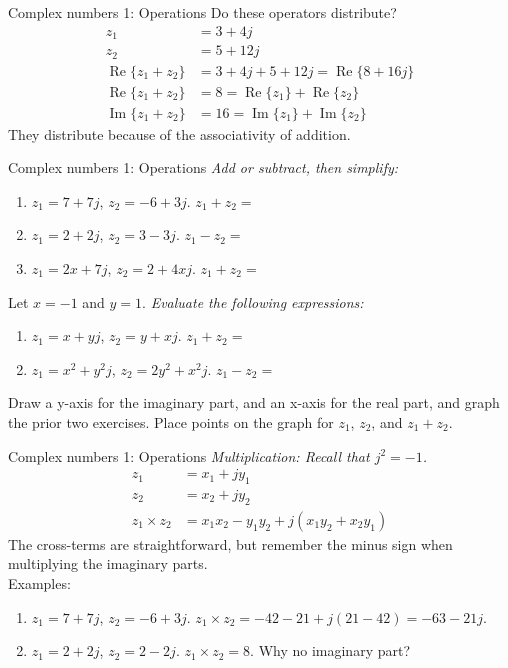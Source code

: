 \documentclass{beamer}
\begin{document}
\begin{frame}{Complex numbers 1: Operations}
Do these operators distribute?
\begin{align}
z_1 &= 3+4j \\
z_2 &= 5+12j \\
\operatorname{Re}\lbrace z_1+z_2 \rbrace &= 3+4j+5+12j = \operatorname{Re}\lbrace 8+16j \rbrace \\
\operatorname{Re}\lbrace z_1+z_2 \rbrace &= 8 = \operatorname{Re}\lbrace z_1 \rbrace + \operatorname{Re}\lbrace z_2 \rbrace \\
\operatorname{Im}\lbrace z_1+z_2 \rbrace &= 16 = \operatorname{Im}\lbrace z_1 \rbrace + \operatorname{Im}\lbrace z_2 \rbrace
\end{align}
They distribute because of the associativity of addition.
\end{frame}

\begin{frame}{Complex numbers 1: Operations}
\textit{Add or subtract, then simplify:}
\begin{enumerate}
\item $z_1 = 7+7j$, $z_2 = -6+3j$.  $z_1+z_2 = $
\item $z_1 = 2+2j$, $z_2 = 3-3j$.  $z_1-z_2 = $
\item $z_1 = 2x+7j$, $z_2 = 2+4xj$.  $z_1+z_2 = $
\end{enumerate}
Let $x=-1$ and $y=1$.  \textit{Evaluate the following expressions:}
\begin{enumerate}
\item $z_1 = x+yj$, $z_2 = y+xj$.  $z_1+z_2 = $
\item $z_1 = x^2+y^2j$, $z_2 = 2y^2+x^2j$.  $z_1-z_2 = $
\end{enumerate}
Draw a y-axis for the imaginary part, and an x-axis for the real part, and graph the prior two exercises.  Place points on the graph for $z_1$, $z_2$, and $z_1+z_2$.
\end{frame}

\begin{frame}{Complex numbers 1: Operations}
\textit{Multiplication: Recall that $j^2 = -1$.}
\begin{align}
z_1 &= x_1+jy_1 \\
z_2 &= x_2 + j y_2 \\
z_1 \times z_2 &= x_1 x_2 - y_1 y_2 + j (x_1 y_2 + x_2 y_1)
\end{align}
The cross-terms are straightforward, but remember the minus sign when multiplying the imaginary parts. \\ \vspace{0.5cm}
Examples:
\begin{enumerate}
\item $z_1 = 7+7j$, $z_2 = -6+3j$.  $z_1 \times z_2 = -42-21 + j(21-42) = -63-21j$.
\item $z_1 = 2+2j$, $z_2 = 2-2j$.  $z_1 \times z_2 = 8$.  Why no imaginary part?
\end{enumerate}
\end{frame}
\end{document}
